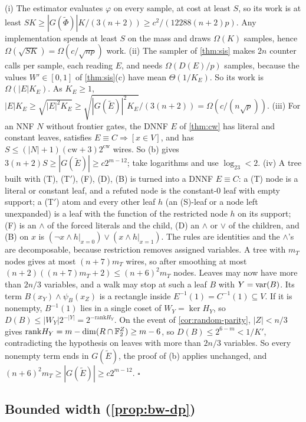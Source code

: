 (i) The estimator evaluates $\varphi$ on every sample, at cost at least $S$, so its work
is at least $SK\ge|G(\widetilde\Phi)|K/(3(n+2))\ge c^2/(12288(n+2)p)$. Any
implementation spends at least $S$ on the mass and draws $\Omega(K)$ samples, hence
$\Omega(\sqrt{SK})=\Omega(c/\sqrt{np})$ work.
(ii) The sampler of \cref{thm:sis} makes $2n$ counter calls per sample, each reading
$E$, and needs $\Omega(D(E)/p)$ samples, because the values $W'\in[0,1]$ of
\cref{thm:sis}(c) have mean $\Theta(1/K_E)$. So its work is $\Omega(|E|K_E)$. As $K_E\ge1$,
$|E|K_E\ge\sqrt{|E|^2K_E}\ge\sqrt{|G(\widetilde E)|^2K_E}/(3(n+2))=\Omega(c/(n\sqrt p))$.
(iii) For an NNF $N$ without frontier gates, the DNNF $E$ of \cref{thm:cw} has
literal and constant leaves, satisfies $E\equiv C\Rightarrow[x\in V]$, and has
$S\le(|N|+1)(\mathrm{cw}+3)2^{\mathrm{cw}}$ wires. So (b) gives
$3(n+2)S\ge|G(\widetilde E)|\ge c2^{m-12}$; take logarithms and use $\log_23<2$.
(iv) A tree built with (T), (T$'$), (F), (D), (B) is turned into a DNNF $E\equiv C$: a
(T) node is a literal or constant leaf, and a refuted node is the constant-$0$ leaf with
empty support; a (T$'$) atom and every other leaf $h$ (an (S)-leaf or a node left
unexpanded) is a leaf with the function of the restricted node $h$ on its support; (F) is an $\wedge$ of the
forced literals and the child, (D) an $\wedge$ or $\vee$ of the children, and (B) on $x$ is
$(\neg x\wedge h|_{x=0})\vee(x\wedge h|_{x=1})$. The rules are identities and the
$\wedge$'s are decomposable, because restriction removes assigned variables. A tree
with $m_T$ nodes gives at most $(n+7)m_T$ wires, so after smoothing at most
$(n+2)((n+7)m_T+2)\le(n+6)^2m_T$ nodes. Leaves may now have more than $2n/3$
variables, and a walk may stop at such a leaf $B$ with $Y=\mathrm{var}(B)$. Its term $B(x_Y)\wedge
\psi_B(x_Z)$ is a rectangle inside $E^{-1}(1)=C^{-1}(1)\subseteq V$. If it is nonempty,
$B^{-1}(1)$ lies in a single coset of $W_Y=\ker H_Y$, so
$D(B)\le|W_Y|2^{-|Y|}=2^{-\mathrm{rank}H_Y}$. On the event of
\cref{cor:random-parity}, $|Z|<n/3$ gives $\mathrm{rank}H_Y=m-\dim(R\cap\mathbb{F}_2^Z)\ge m-6$,
so $D(B)\le2^{6-m}<1/K'$, contradicting the hypothesis on leaves with more than $2n/3$
variables. So every nonempty term ends in $G(\widetilde E)$, the proof of (b) applies
unchanged, and
$(n+6)^2m_T\ge|G(\widetilde E)|\ge c2^{m-12}$.
\hfill$\square$

\subsection{Bounded width (\cref{prop:bw-dp})}

